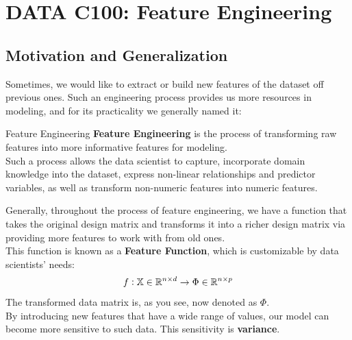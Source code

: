 \chapter{DATA C100: Feature Engineering}

\section{Motivation and Generalization}
Sometimes, we would like to extract or build new features of the dataset off previous ones. Such an engineering process provides us more resources in modeling, and for its practicality we generally named it:
\begin{ln-define}{Feature Engineering}{}
    \textbf{Feature Engineering} is the process of transforming raw features into more informative features for modeling. \\
    Such a process allows the data scientist to capture, incorporate domain knowledge into the dataset, express non-linear relationships and predictor variables, as well as transform non-numeric features into numeric features.
\end{ln-define}
Generally, throughout the process of feature engineering, we have a function that takes the original design matrix and transforms it into a richer design matrix via providing more features to work with from old ones. \\
This function is known as a \textbf{Feature Function}, which is customizable by data scientists' needs:
\[f: \mathbb{X} \in \mathbb{R}^{n \times d} \rightarrow \Phi \in \mathbb{R}^{n \times p}\]
The transformed data matrix is, as you see, now denoted as $\Phi$. \\
By introducing new features that have a wide range of values, our model can become more sensitive to such data. This sensitivity is \textbf{variance}.

